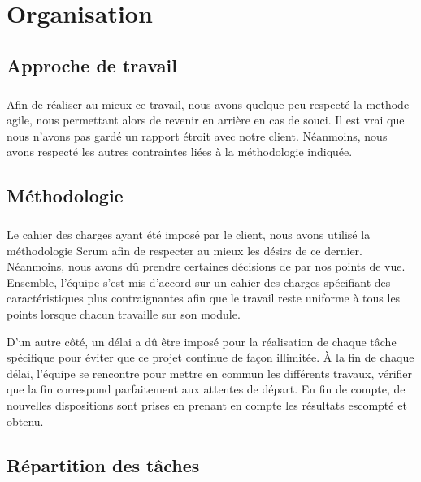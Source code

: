 \chapter{Organisation}
        \section{Approche de travail}
\paragraph{}
Afin de réaliser au mieux ce travail, nous avons quelque peu respecté la methode agile,
nous permettant alors de revenir en arrière en cas de souci. Il est vrai que nous
n'avons pas gardé un rapport étroit avec notre client. Néanmoins, nous avons respecté 
les autres contraintes liées à la méthodologie indiquée.
        \section{Méthodologie}
\paragraph{}
Le cahier des charges ayant été imposé par le client, nous avons utilisé la méthodologie
Scrum afin de respecter au mieux les désirs de ce dernier. Néanmoins, nous avons dû prendre
certaines décisions de par nos points de vue. Ensemble, l'équipe s'est mis d'accord sur un
cahier des charges spécifiant des caractéristiques plus contraignantes afin que le travail
reste uniforme à tous les points lorsque chacun travaille sur son module. \par 
D'un autre côté, un délai a dû être imposé pour la réalisation de chaque tâche spécifique
pour éviter que ce projet continue de façon illimitée. À la fin de chaque délai, l'équipe
se rencontre pour mettre en commun les différents travaux, vérifier que la fin correspond
parfaitement aux attentes de départ. En fin de compte, de nouvelles dispositions sont 
prises en prenant en compte les résultats escompté et obtenu.
        \section{Répartition des tâches}
